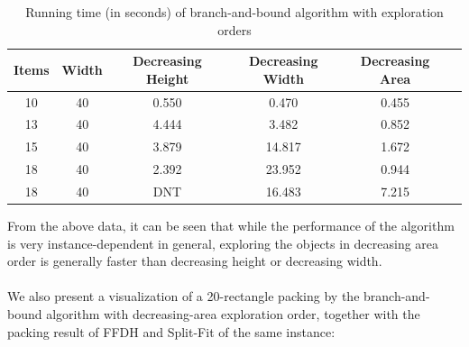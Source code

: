 \documentclass{article}
\begin{document}
\begin{table}[!h]
\centering
\begin{tabular}{|c|c|c|c|c|c|}
\hline Items & Width & Decreasing Height & Decreasing Width & Decreasing Area \\
\hline 10 & 40 & 0.550 & 0.470 & 0.455\\
\hline 13 & 40 & 4.444 & 3.482 & 0.852\\
\hline 15 & 40 & 3.879 & 14.817 & 1.672\\
\hline 18 & 40 & 2.392 & 23.952 & 0.944\\
\hline 18 & 40 & DNT & 16.483 & 7.215\\
\hline
\end{tabular}
\caption{Running time (in seconds) of branch-and-bound algorithm with exploration orders}
\label{table:smallinstances}
\end{table}
\noindent
From the above data, it can be seen that while the performance of the algorithm is very instance-dependent in general, exploring the objects in decreasing area order is generally faster than decreasing height or decreasing width.\\
\\
We also present a visualization of a 20-rectangle packing by the branch-and-bound algorithm with decreasing-area exploration order, together with the packing result of FFDH and Split-Fit of the same instance:
\end{document}
